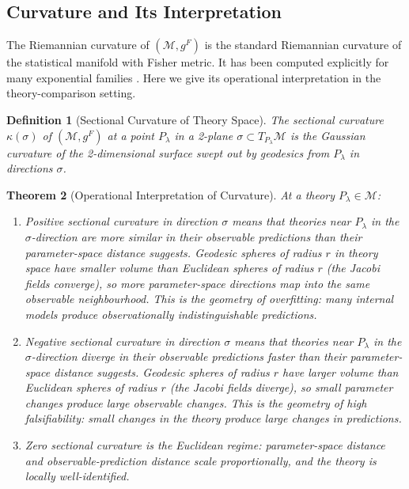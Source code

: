 \documentclass[12pt,a4paper]{article}
\newtheorem{theorem}{Theorem}[section]
\newtheorem{definition}[theorem]{Definition}
\theoremstyle{remark}
\theoremstyle{definition}
\begin{document}
\subsection{Curvature and Its Interpretation}

The Riemannian curvature of $(\mathcal{M}, g^F)$ is the standard
Riemannian curvature of the statistical manifold with Fisher metric. It
has been computed explicitly for many exponential families \cite{amari2000}.
Here we give its operational interpretation in the theory-comparison setting.

\begin{definition}[Sectional Curvature of Theory Space]
The \emph{sectional curvature} $\kappa(\sigma)$ of $(\mathcal{M}, g^F)$
at a point $P_\lambda$ in a 2-plane $\sigma \subset T_{P_\lambda}\mathcal{M}$
is the Gaussian curvature of the 2-dimensional surface swept out by
geodesics from $P_\lambda$ in directions $\sigma$.
\end{definition}

\begin{theorem}[Operational Interpretation of Curvature]
\label{thm:curvature}
At a theory $P_\lambda \in \mathcal{M}$:
\begin{enumerate}[label=(\roman*)]
  \item Positive sectional curvature in direction $\sigma$ means that
        theories near $P_\lambda$ in the $\sigma$-direction are more
        similar in their observable predictions than their parameter-space
        distance suggests. Geodesic spheres of radius $r$ in theory space
        have \emph{smaller} volume than Euclidean spheres of radius $r$
        (the Jacobi fields converge), so more parameter-space directions
        map into the same observable neighbourhood. This is the geometry
        of \emph{overfitting}: many internal models produce
        observationally indistinguishable predictions.
  \item Negative sectional curvature in direction $\sigma$ means that
        theories near $P_\lambda$ in the $\sigma$-direction diverge in
        their observable predictions faster than their parameter-space
        distance suggests. Geodesic spheres of radius $r$ have \emph{larger}
        volume than Euclidean spheres of radius $r$ (the Jacobi fields
        diverge), so small parameter changes produce large observable
        changes. This is the geometry of \emph{high falsifiability}:
        small changes in the theory produce large changes in predictions.
  \item Zero sectional curvature is the Euclidean regime:
        parameter-space distance and observable-prediction distance
        scale proportionally, and the theory is locally well-identified.
\end{enumerate}
\end{theorem}
\end{document}
